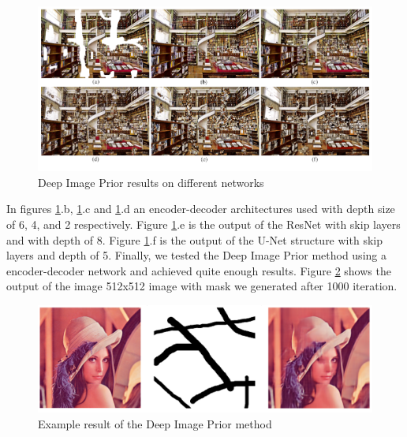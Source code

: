 \begin{figure}[h!]
    \centering
    \includegraphics[width=13cm]{figures/chapter4/imprior4.png}
    \caption{Deep Image Prior results on different networks \cite{deep_image_prior}}
    \label{fig:prior_multimodels}
\end{figure}

In figures \ref{fig:prior_multimodels}.b, \ref{fig:prior_multimodels}.c and \ref{fig:prior_multimodels}.d an encoder-decoder architectures used with depth size of 6, 4, and 2 respectively. Figure \ref{fig:prior_multimodels}.e is the output of the ResNet with skip layers and with depth of 8. Figure \ref{fig:prior_multimodels}.f is the output of the U-Net structure with skip layers and depth of 5. Finally, we tested the Deep Image Prior method using a encoder-decoder network and achieved quite enough results. Figure \ref{fig:prior_lenna} shows the output of the image 512x512 image with mask we generated after 1000 iteration.

\begin{figure}[h!]
    \centering
    \includegraphics[width=14cm]{figures/chapter4/impriorout.png}
    \vspace*{3mm}
    \caption{Example result of the Deep Image Prior method}
    \label{fig:prior_lenna}
\end{figure}